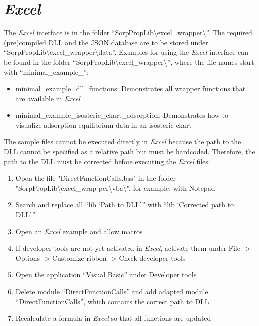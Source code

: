 \section{\textit{Excel}}
\label{cha:usage:excel}
%
The \textit{Excel} interface is in the folder “SorpPropLib\textbackslash excel\_wrapper\textbackslash ”. The required (pre)compiled DLL and the JSON database are to be stored under “SorpPropLib\textbackslash excel\_wrapper\textbackslash data”. Examples for using the \textit{Excel} interface can be found in the folder “SorpPropLib\textbackslash excel\_wrapper\textbackslash ”, where the file names start with “minimal\_example\_”:
\begin{itemize}
	\item minimal\_example\_dll\_functions: Demonstrates all wrapper functions that are available in \textit{Excel}
	\item minimal\_example\_isosteric\_chart\_adsorption: Demonstrates how to visualize adsorption equilibrium data in an isosteric chart
\end{itemize}
The sample files cannot be executed directly in \textit{Excel} because the path to the DLL cannot be specified as a relative path but must be hardcoded. Therefore, the path to the DLL must be corrected before executing the \textit{Excel} files:
\begin{enumerate}
	\item Open the file "DirectFunctionCalls.bas" in the folder "SorpPropLib\textbackslash excel\_wrap-per\textbackslash vba\textbackslash ", for example, with Notepad
	\item Search and replace all “lib ‘Path to DLL’” with “lib ‘Corrected path to DLL’”
	\item Open an \textit{Excel} example and allow macros
	\item If developer tools are not yet activated in \textit{Excel}, activate them under File -> Options -> Customize ribbon -> Check developer tools
	\item Open the application “Visual Basic” under Developer tools
	\item Delete module “DirectFunctionCalls” and add adapted module “DirectFunctionCalls”, which contains the correct path to DLL
	\item Recalculate a formula in \textit{Excel} so that all functions are updated
\end{enumerate}
